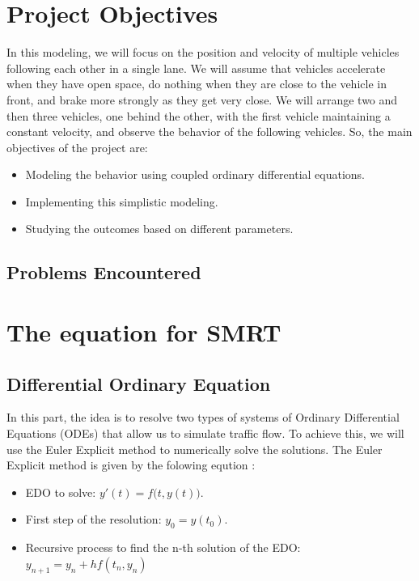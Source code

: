 \documentclass{article}
\begin{document}
	\section{Project Objectives}
	In this modeling, we will focus on the position and velocity of multiple vehicles following each other in a single lane. We will assume that vehicles accelerate when they have open space, do nothing when they are close to the vehicle in front, and brake more strongly as they get very close. We will arrange two and then three vehicles, one behind the other, with the first vehicle maintaining a constant velocity, and observe the behavior of the following vehicles.\newline
	So, the main objectives of the project are: 
	\begin{itemize}
		\item Modeling the behavior using coupled ordinary differential equations.
		\item Implementing this simplistic modeling.
		\item Studying the outcomes based on different parameters.
	\end{itemize}
	\subsection{Problems Encountered}
	
	\section{The equation for SMRT}
		\subsection{Differential Ordinary Equation }
		In this part, the idea is to resolve two types of systems of Ordinary Differential Equations (ODEs) that allow us to simulate traffic flow. To achieve this, we will use the Euler Explicit method to numerically solve the solutions.
		The Euler Explicit method is given by the folowing eqution :
		\begin{itemize}
			\item EDO to solve: $\boxed{y'(t) = f{\bigl (}t, y(t){\bigr )}}$.
			\item First step of the resolution: $\boxed{y_0 = y(t_0)}$.
			\item Recursive process to find the n-th solution of the EDO: $\boxed{y_{n+1} = y_{n} + hf(t_{n}, y_{n})}$
		\end{itemize}
		
\end{document}
